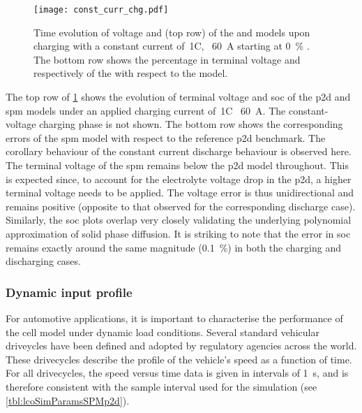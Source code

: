 \begin{figure}[!htbp]
    \centering
    \texttt{[image: const\_curr\_chg.pdf]}
    \caption[Voltage and  computed by  and
     for 1C~constant current charge]{Time evolution of voltage
        and  (top row) of the  and
         models upon charging with a constant current of~1C,
        \ie~\SI{60}{\ampere} starting at \SI{0}{\percent} .
        The bottom row shows the percentage in terminal voltage and
         respectively of the  with respect to
    the  model.}
    \label{fig:cnstchgspmp2d}
\end{figure}

The top row of \cref{fig:cnstchgspmp2d} shows  the evolution of terminal voltage
and \gls{soc}  of the \gls{p2d} and  \gls{spm} models under an  applied charging
current of~1C \ie~\SI{60}{\ampere}.  The constant-voltage charging  phase is
not shown. The bottom row shows  the corresponding errors of the \gls{spm} model
with respect  to the reference  \gls{p2d} benchmark. The corollary  behaviour of
the constant current discharge behaviour  is observed here. The terminal voltage
of the \gls{spm} remains below the  \gls{p2d} model throughout. This is expected
since, to  account for the electrolyte  voltage drop in the  \gls{p2d}, a higher
terminal voltage needs  to be applied. The voltage error  is thus unidirectional
and remains positive (opposite to  that observed for the corresponding discharge
case).  Similarly,  the \gls{soc}  plots  overlap  very closely  validating  the
underlying polynomial approximation of solid  phase diffusion. It is striking to
note  that the  error in  \gls{soc} remains  exactly around  the same  magnitude
(\approx\SI{0.1}{\percent}) in both the charging and discharging cases.

\subsubsection*{Dynamic input profile}\label{subsubsec:dynamicspmp2dsim}

For automotive applications, it is  important to characterise the performance of
the  cell  model  under  dynamic load  conditions.  Several  standard  vehicular
driveycles  have been  defined and  adopted  by regulatory  agencies across  the
world.  These drivecycles  describe  the profile  of the  vehicle's  speed as  a
function of time.  For all drivecycles, the  speed versus time data  is given in
intervals  of  \SI{1}{\second}, and  is  therefore  consistent with  the  sample
interval used for the simulation (see \cref{tbl:lcoSimParamsSPMp2d}).

